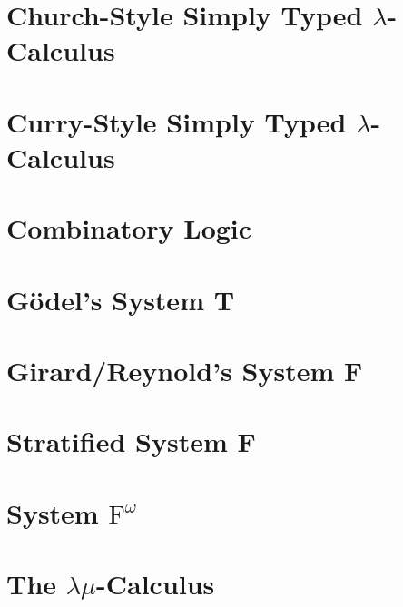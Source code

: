 \documentclass[phd,appendix,dedicationpage,ackpage,epigraphpage]{uithesis}
\begin{document}
\newpage
\section{Church-Style Simply Typed $\lambda$-Calculus}
\label{sec:church_style_simply_typed_lambda-calculus}
\CHSTLCall{}

\newpage
\section{Curry-Style Simply Typed $\lambda$-Calculus}
\label{sec:curry_style_simply_typed_lambda-calculus}
\CSTLCall{}

\newpage
\section{Combinatory Logic}
\label{sec:combinatory_logic}
\Comball{}

\newpage
\section{G\"odel's System T}
\label{sec:godels_system_t}
\Tall{}

\newpage
\section{Girard/Reynold's System F}
\label{sec:girard-reynolds_system_f}
\Fall{}

\newpage
\section{Stratified System F}
\label{sec:stratified_system_f}
\SSFall{}

\newpage
\section{System $\text{F}^\omega$}
\label{sec:system_fw}
\Fwall{}

\newpage
\section{The $\lambda\mu$-Calculus}
\label{sec:lamu_all}
\Lamuall{}
\end{document}
